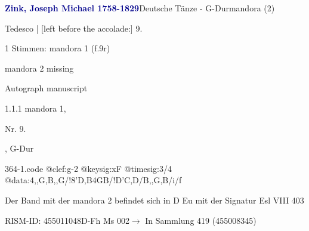 \documentclass[twocolumn]{book}
\begin{document}
\par \vspace{7pt} \textcolor{darkblue}{\textbf{Zink, Joseph Michael  1758-1829}}\hfillplus{\textbf{[364]}}\newline Deutsche Tänze - G-Dur\newline mandora (2)
\par \begin{itshape}[f.9r, at left:] Tedesco | [left before the accolade:] 9.\end{itshape} 
\par \textcolor{darkblue}{}  1 Stimmen: mandora 1  (f.9r)\newline \begin{small} mandora 2 missing\end{small} \newline Autograph manuscript
\par 1.1.1  mandora 1, \begin{itshape}Nr. 9.\end{itshape}, G-Dur  
\begin{filecontents*}{364-1.code}
@clef:g-2
@keysig:xF
@timesig:3/4
@data:4,,G,B,,G/!8'D,B4GB/!D'C,D/B,,G,B/i/f
\end{filecontents*}
\newline
%
\par Der Band mit der mandora 2 befindet sich in D Eu mit der Signatur Esl VIII 403
\par RISM-ID: 455011048\newline D-Fh  Ms 002\newline $\rightarrow$ In Sammlung 419 (455008345)
      
\end{document}
